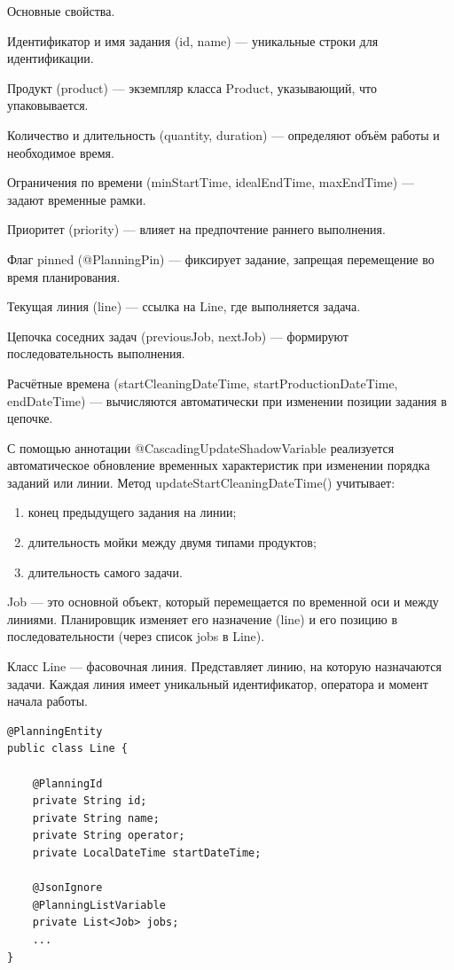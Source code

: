  Основные свойства. 

Идентификатор и имя задания (id, name) — уникальные строки для идентификации.

Продукт (product) — экземпляр класса Product, указывающий, что упаковывается.

Количество и длительность (quantity, duration) — определяют объём работы и необходимое время.

Ограничения по времени (minStartTime, idealEndTime, maxEndTime) — задают временные рамки.

Приоритет (priority) — влияет на предпочтение раннего выполнения.

Флаг pinned (@PlanningPin) — фиксирует задание, запрещая перемещение во время планирования.

Текущая линия (line) — ссылка на Line, где выполняется задача.

Цепочка соседних задач (previousJob, nextJob) — формируют последовательность выполнения.

Расчётные времена (startCleaningDateTime, startProductionDateTime, endDateTime) — вычисляются автоматически при изменении позиции задания в цепочке.

 С помощью аннотации @CascadingUpdateShadowVariable реализуется автоматическое обновление временных характеристик при изменении порядка заданий или линии. Метод updateStartCleaningDateTime() учитывает:
 \begin{enumerate}
    \item конец предыдущего задания на линии;
    \item длительность мойки между двумя типами продуктов;
    \item длительность самого задачи.
 \end{enumerate}

 Job — это основной объект, который перемещается по временной оси и между линиями. Планировщик изменяет его назначение (line) и его позицию в последовательности (через список jobs в Line).
 
Класс Line — фасовочная линия. Представляет линию, на которую назначаются задачи. Каждая линия имеет уникальный идентификатор, оператора и момент начала работы.

\begin{lstlisting}[caption={класс Line}, label={lst:classLine}]
@PlanningEntity
public class Line {

    @PlanningId
    private String id;
    private String name;
    private String operator;
    private LocalDateTime startDateTime;

    @JsonIgnore
    @PlanningListVariable
    private List<Job> jobs;
    ...
}
\end{lstlisting}

